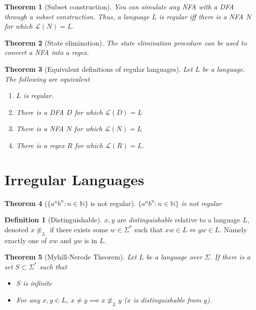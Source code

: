 \documentclass[12pt]{article}
\newtheorem{theorem}{Theorem}[section]
\theoremstyle{definition}
\newtheorem{definition}{Definition}[section]
\begin{document}
\begin{theorem}[Subset construction]
    You can simulate any NFA with a DFA through a subset construction. Thus, a language $L$ is regular iff there is a NFA $N$ for which $\mathcal{L}(N) = L$.
\end{theorem}

\begin{theorem}[State elimination]
    The state elimination procedure can be used to convert a NFA into a regex.
\end{theorem}

\begin{theorem}[Equivalent definitions of regular languages]
    Let $L$ be a language. The following are equivalent
    \begin{enumerate}
        \item $L$ is regular.
        \item There is a DFA $D$ for which $\mathcal{L}(D) = L$
        \item There is a NFA $N$ for which $\mathcal{L}(N) = L$
        \item There is a regex $R$ for which $\mathcal{L}(R) = L$.
    \end{enumerate}
\end{theorem}

\section{Irregular Languages}

\begin{theorem}[$\{a^nb^n: n \in \mathbb{N}\}$ is not regular]
    $\{a^nb^n: n \in \mathbb{N}\}$ is not regular
\end{theorem}

\begin{definition}[Distinguishable]
    $x, y$ are \emph{distinguishable} relative to a language $L$, denoted $x \not \equiv_L$ if there exists some $w  \in \Sigma^*$ such that $xw \in L \iff yw \in L$. Namely exactly one of $xw$ and $yw$ is in $L$.
\end{definition}

\begin{theorem}[Myhill-Nerode Theorem]
    Let $L$ be a language over $\Sigma$. If there is a set $S \subset \Sigma^*$ such that 
    \begin{itemize}
        \item $S$ is infinite
        \item For any $x, y \in L$, $x \neq y \implies x \not\equiv_L y$ ($x$ is distinguishable from $y$).
    \end{itemize}
\end{theorem}
\end{document}
